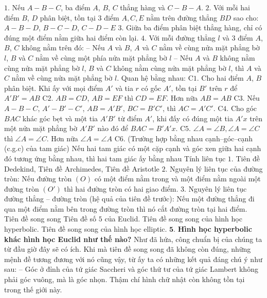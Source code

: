 \begin{multicols}{2}
	\vskip 0.1cm
	$1.$ Nếu $A - B - C$, ba điểm $A$, $B$, $C$ thẳng hàng và $C - B - A$.
	\vskip 0.1cm
	$2.$ Với mỗi hai điểm $B$, $D$ phân biệt, tồn tại $3$ điểm $A, C, E$ nằm trên đường thẳng $BD$ sao cho: $A - B - D$, $B - C - D$, $C - D - E$ 
	\vskip 0.1cm
	$3.$ Giữa ba điểm phân biệt thẳng hàng, chỉ có đúng một điểm nằm giữa hai điểm còn lại.
	\vskip 0.1cm
	$4.$ Với mỗi đường thẳng $l$ và $3$ điểm $A$, $B$, $C$ không nằm trên đó:
	\vskip 0.1cm
	-- Nếu $A$ và $B$, $A$ và $C$ nằm về cùng nửa mặt phẳng bờ $l$, $B$ và $C$ nằm về cùng một phía nửa mặt phẳng bờ $l$
	\vskip 0.1cm
	-- Nếu $A$ và $B$ không nằm cùng nửa mặt phẳng bờ $l$, $B$ và $C$ không nằm cùng nửa mặt phẳng bờ $l$, thì $A$ và $C$ nằm về cùng nửa mặt phẳng bờ $l$.
	\vskip 0.1cm
	Quan hệ bằng nhau: 
	\vskip 0.1cm
	C$1$. Cho hai điểm $A$, $B$ phân biệt. Khi ấy với mọi điểm $A'$ và tia $r$ có gốc $A'$, tồn tại $B'$ trên $r$ để $A'B' = AB$ 
	\vskip 0.1cm
	C$2$. $AB = CD$, $AB = EF$ thì $CD = EF$. Hơn nữa $AB = AB$
	\vskip 0.1cm
	C$3$. Nếu $A - B - C$, $A' - B' - C'$, $AB = A'B'$, $BC = B'C'$, thì $AC = A'C'$.
	\vskip 0.1cm
	C$4$. Cho góc $BAC$ khác góc bẹt và một tia $A'B'$ từ điểm $A'$, khi đấy có đúng một tia $A'x$ trên một nửa mặt phẳng bờ $A'B'$ nào đó để $BAC = B'A'x$.
	\vskip 0.1cm
	C$5$. $ \angle A = \angle B, \angle A = \angle C$ thì $ \angle A = \angle C$. Hơn nữa $ \angle A = \angle A$ 
	\vskip 0.1cm
	C$6$. (Trường hợp bằng nhau cạnh--góc--cạnh (c.g.c) của tam giác) Nếu hai tam giác có một cặp cạnh và góc xen giữa hai cạnh đó tương ứng bằng nhau, thì hai tam giác ấy bằng nhau
	\vskip 0.1cm
	Tính liên tục
	\vskip 0.1cm
	$1.$ Tiên đề Dedekind, Tiên đề Archimedes, Tiên đề Aristotle
	\vskip 0.1cm
	$2.$ Nguyên lý liên tục của đường tròn: Nếu đường tròn $(O)$ có một điểm nằm trong và một điểm nằm ngoài một đường tròn $(O')$ thì hai đường tròn có hai giao điểm.
	\vskip 0.1cm
	$3.$ Nguyên lý liên tục đường thẳng -- đường tròn (hệ quả của tiên đề trước): Nếu một đường thẳng đi qua một điểm nằm bên trong đường tròn thì nó cắt đường tròn tại hai điểm.
	\vskip 0.1cm
	Tiên đề song song
	\vskip 0.1cm
	Tiên đề số $5$ của Euclid.
	\vskip 0.1cm
	Tiên đề song song của hình học hyperbolic. 
	\vskip 0.1cm
	Tiên đề song song của hình học elliptic.
	\vskip 0.1cm
	$\pmb{5.}$ \textbf{\color{lichsutoanhoc}Hình học hyperbolic khác hình học Euclid như thế nào?}
	\vskip 0.1cm
	Như đã hứa, công chuẩn bị của chúng ta từ đầu giờ đây sẽ có ích. Khi mà tiên đề song song đã không còn đúng, những mệnh đề tương đương với nó cũng vậy, từ ấy ta có những kết quả đáng chú ý như sau:
	\vskip 0.1cm
	-- Góc ở đỉnh của tứ giác Saccheri và góc thứ tư của tứ giác Lambert không phải góc vuông, mà là góc nhọn. Thậm chí hình chữ nhật còn không tồn tại trong thế giới này. 

\end{multicols}
